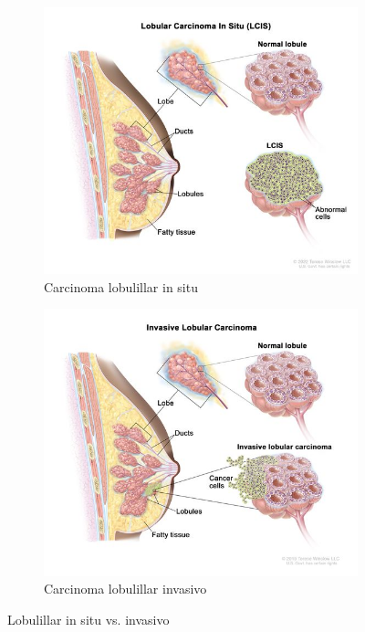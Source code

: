 \documentclass[a4paper,10pt]{book}
\begin{document}
\begin{figure}[h!]
    \centering
    \begin{subfigure}[c]{0.48\textwidth}
        \centering
        \includegraphics[width=\textwidth]{reports/assets/lcis.jpg}
        \caption{Carcinoma lobulillar in situ}
        \label{fig:lcis}
    \end{subfigure}
    \begin{subfigure}[c]{0.48\textwidth}
        \centering
        \includegraphics[width=\textwidth]{reports/assets/ilc.jpg}
        \caption{Carcinoma lobulillar invasivo}
        \label{fig:ilc}
    \end{subfigure}
    \caption{Lobulillar in situ vs. invasivo \cite{noauthor_nci_2011}}
    \label{fig:histological_types_two}
\end{figure}
\end{document}
